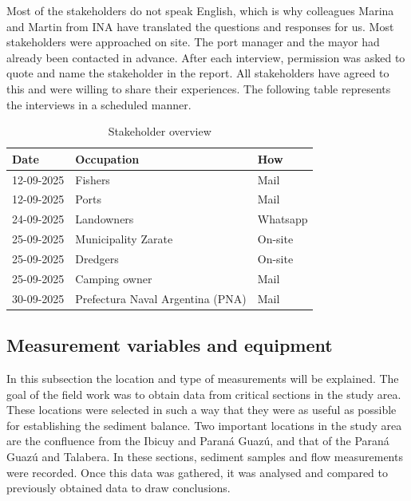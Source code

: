 
Most of the stakeholders do not speak English, which is why colleagues Marina and Martin from INA have translated the questions and responses for us. Most stakeholders were approached on site. The port manager and the mayor had already been contacted in advance. After each interview, permission was asked to quote and name the stakeholder in the report. All stakeholders have agreed to this and were willing to share their experiences. The following table represents the interviews in a scheduled manner. 

\begin{table}[H]
    \centering
    \renewcommand{\arraystretch}{1.2}
    \setlength{\tabcolsep}{4pt}
    \begin{tabularx}{\textwidth}{l l X}
        \toprule
        Date & Occupation & How \\
        \midrule
        12-09-2025 & Fishers & Mail \\
        12-09-2025 & Ports & Mail \\
        24-09-2025 & Landowners & Whatsapp \\
        25-09-2025 & Municipality Zarate & On-site \\
        25-09-2025 & Dredgers & On-site \\
        25-09-2025 & Camping owner & Mail \\
        30-09-2025 & Prefectura Naval Argentina (PNA) & Mail \\
        
        \bottomrule
    \end{tabularx}
    \caption{Stakeholder overview}
    \label{tab:stakeholders}
\end{table}


\subsection{Measurement variables and equipment}
\label{Measurement variables and equipment}
In this subsection the location and type of measurements will be explained. The goal of the field work was to obtain data from critical sections in the study area. These locations were selected in such a way that they were as useful as possible for establishing the sediment balance. Two important locations in the study area are the confluence from the Ibicuy and Paraná Guazú, and that of the Paraná Guazú and Talabera. In these sections, sediment samples and flow measurements were recorded.
Once this data was gathered, it was analysed and compared to previously obtained data to draw conclusions. 


